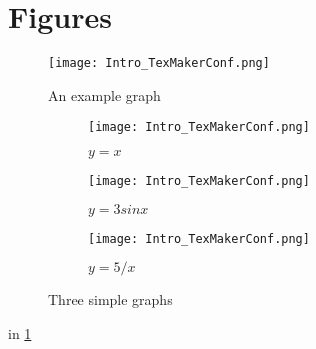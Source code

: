 \section{Figures}\label{sec:Elements_figures}
%

\begin{figure}[h]
\centering
\texttt{[image: Intro\_TexMakerConf.png]}
\caption[Resume line]{An example graph}
\label{fig:x cubed graph}
\end{figure}


\begin{figure}[h]
    \centering
    \begin{subfigure}[b]{.3\textwidth}
        \centering
        \texttt{[image: Intro\_TexMakerConf.png]}
        \caption{$y=x$}
        \label{fig:x}
    \end{subfigure}
    \hfill
    \begin{subfigure}[b]{0.3\textwidth}
        \centering
        \texttt{[image: Intro\_TexMakerConf.png]}
        \caption{$y=3sinx$}
        \label{fig:3sinx}
    \end{subfigure}
    \hfill
    \begin{subfigure}[b]{0.3\textwidth}
        \centering
        \texttt{[image: Intro\_TexMakerConf.png]}
        \caption{$y=5/x$}
        \label{fig:5overx}
    \end{subfigure}
    \caption[Resume line]{Three simple graphs}
    \label{fig:three_graphs}
\end{figure}
in \ref{fig:x cubed graph} 